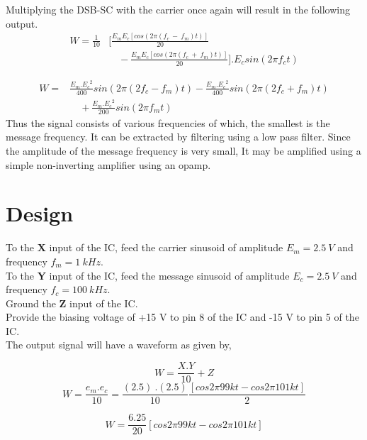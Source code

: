 Multiplying the DSB-SC with the carrier once again will result in the following output.
\begin{equation}
\begin{split}
W=\frac{1}{10} &[ \frac{E_mE_c [cos (2\pi (f_c\ -\ f_m)t)]}{20} \\
&\quad -\frac{E_mE_c[cos (2\pi (f_c\ +\ f_m)t)]}{20}].
 E_c sin(2\pi f_ct)
\end{split}
\end{equation}

\begin{equation}
\begin{split}
W=& \frac{E_m.{E_c}^2}{400}sin(2\pi (2f_c-f_m)t)  -  \frac{E_m.{E_c}^2}{400}sin(2\pi (2f_c+f_m)t)\\ 
&\quad +\frac{E_m.{E_c}^2}{200}sin(2\pi f_mt)
\end{split}
\end{equation}
Thus the signal consists of various frequencies of which, the smallest is the message frequency. It can be extracted by filtering using a low pass filter. Since the amplitude of the message frequency is very small, It may be amplified using a simple non-inverting amplifier using an opamp.

\section*{Design}

To the \textbf{X} input of the IC, feed the carrier sinusoid of amplitude $E_m=2.5\ V$ and frequency $f_m= 1\ kHz$.\\

To the \textbf{Y} input of the IC, feed the message sinusoid of amplitude $E_c=2.5\ V$ and frequency $f_c= 100\ kHz$.\\
Ground the \textbf{Z} input of the IC.\\
Provide the biasing voltage of +15 V to pin 8 of the IC and -15 V to pin 5 of the IC.\\

The output signal will have a waveform as given by,

\begin{equation}
W=\frac{X.Y}{10}+Z
\end{equation}
\begin{equation}
W=\frac{e_m.e_c}{10}=\frac{(2.5) \ .(2.5)}{10}\frac{[cos 2\pi99kt-cos 2\pi101kt]}{2}
\end{equation}

\begin{equation}
W=\frac{6.25}{20}[cos 2\pi99kt-cos 2\pi101kt]
\end{equation}

